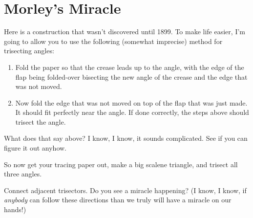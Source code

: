 \newpage
\section{Morley's Miracle} %

Here is a construction that wasn't discovered until 1899. To make life
easier, I'm going to allow you to use the following (somewhat
imprecise) method for trisecting angles:

\begin{enumerate}
\item Fold the paper so that the crease leads up to the
  angle, with the edge of the flap being folded-over bisecting the
  new angle of the crease and the edge that was not moved.
\item Now fold the edge that was not moved on top of the flap that was
  just made. It should fit perfectly near the angle. If done
  correctly, the steps above should trisect the angle.
\end{enumerate}

\begin{prob}
What does that say above? I know, I know, it sounds complicated. See
if you can figure it out anyhow.
\end{prob}

So now get your tracing paper out, make a big scalene triangle, and
trisect all three angles.

\begin{prob}
Connect adjacent trisectors. Do you see a miracle happening? (I know, I
know, if \textit{anybody} can follow these directions than we truly
will have a miracle on our hands!)
\end{prob}
